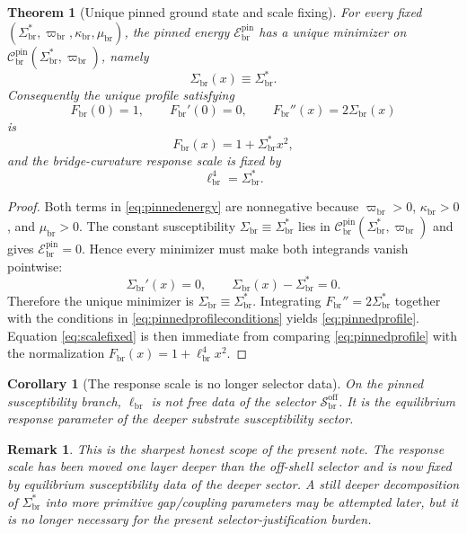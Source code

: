 \documentclass[11pt]{article}
\newcommand{\CurvScale}{\ell_{\mathrm{br}}}
\newcommand{\CurvProfile}{F_{\mathrm{br}}}
\newcommand{\ProfWeight}{\varpi_{\mathrm{br}}}
\newcommand{\ProfRule}{\mathscr S_{\mathrm{br}}^{\mathrm{off}}}
\newcommand{\RespSus}{\Sigma_{\mathrm{br}}}
\newcommand{\RespSusEq}{\Sigma_{\mathrm{br}}^{\ast}}
\newcommand{\RespClass}{\mathscr C_{\mathrm{br}}}
\newcommand{\RespEnergyPin}{\mathscr E_{\mathrm{br}}^{\mathrm{pin}}}
\newcommand{\RespStiff}{\kappa_{\mathrm{br}}}
\newcommand{\RespPin}{\mu_{\mathrm{br}}}
\newtheorem{remark}{Remark}
\newtheorem{corollary}{Corollary}
\newtheorem{theorem}{Theorem}
\begin{document}
\begin{theorem}[Unique pinned ground state and scale fixing]
\label{thm:pinned}
For every fixed \((\RespSusEq,\ProfWeight,\RespStiff,\RespPin)\), the pinned energy \(\RespEnergyPin\) has a unique minimizer on \(\RespClass^{\mathrm{pin}}(\RespSusEq,\ProfWeight)\), namely
\begin{equation}
\RespSus(x)\equiv \RespSusEq.
\label{eq:pinnedground}
\end{equation}
Consequently the unique profile satisfying
\begin{equation}
\CurvProfile(0)=1,
\qquad
\CurvProfile'(0)=0,
\qquad
\CurvProfile''(x)=2\RespSus(x)
\label{eq:pinnedprofileconditions}
\end{equation}
is
\begin{equation}
\CurvProfile(x)=1+\RespSusEq x^2,
\label{eq:pinnedprofile}
\end{equation}
and the bridge-curvature response scale is fixed by
\begin{equation}
\CurvScale^4=\RespSusEq.
\label{eq:scalefixed}
\end{equation}
\end{theorem}

\begin{proof}
Both terms in \eqref{eq:pinnedenergy} are nonnegative because \(\ProfWeight>0\), \(\RespStiff>0\), and \(\RespPin>0\). The constant susceptibility \(\RespSus\equiv\RespSusEq\) lies in \(\RespClass^{\mathrm{pin}}(\RespSusEq,\ProfWeight)\) and gives \(\RespEnergyPin=0\). Hence every minimizer must make both integrands vanish pointwise:
\[
\RespSus'(x)=0,
\qquad
\RespSus(x)-\RespSusEq=0.
\]
Therefore the unique minimizer is \(\RespSus\equiv\RespSusEq\). Integrating \(\CurvProfile''=2\RespSusEq\) together with the conditions in \eqref{eq:pinnedprofileconditions} yields \eqref{eq:pinnedprofile}. Equation \eqref{eq:scalefixed} is then immediate from comparing \eqref{eq:pinnedprofile} with the normalization \(\CurvProfile(x)=1+\CurvScale^4x^2\).
\end{proof}

\begin{corollary}[The response scale is no longer selector data]
\label{cor:notselectordata}
On the pinned susceptibility branch, \(\CurvScale\) is not free data of the selector \(\ProfRule\). It is the equilibrium response parameter of the deeper substrate susceptibility sector.
\end{corollary}

\begin{remark}
This is the sharpest honest scope of the present note. The response scale has been moved one layer deeper than the off-shell selector and is now fixed by equilibrium susceptibility data of the deeper sector. A still deeper decomposition of \(\RespSusEq\) into more primitive gap/coupling parameters may be attempted later, but it is no longer necessary for the present selector-justification burden.
\end{remark}
\end{document}

